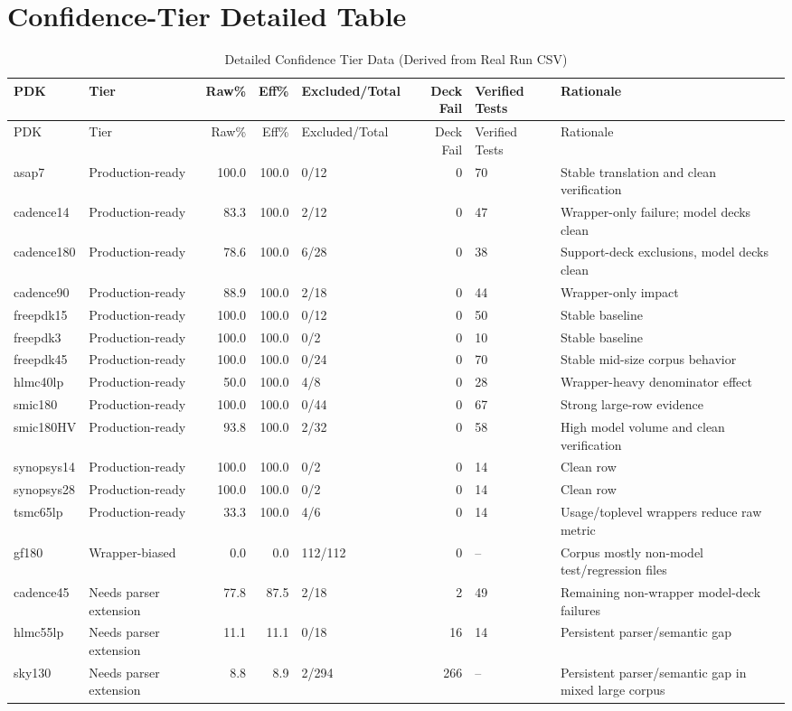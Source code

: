 \documentclass[12pt,a4paper,oneside]{report}
\begin{document}
\chapter{Confidence-Tier Detailed Table}

\begin{landscape}
\small
\begin{longtable}{p{2.2cm}p{2.6cm}r r p{2.0cm}r p{2.4cm}p{4.8cm}}
\caption{Detailed Confidence Tier Data (Derived from Real Run CSV)}
\label{tab:tier-detailed}\\
\toprule
PDK & Tier & Raw\% & Eff\% & Excluded/Total & Deck Fail & Verified Tests & Rationale \\
\midrule
\endfirsthead
\toprule
PDK & Tier & Raw\% & Eff\% & Excluded/Total & Deck Fail & Verified Tests & Rationale \\
\midrule
\endhead
asap7 & Production-ready & 100.0 & 100.0 & 0/12 & 0 & 70 & Stable translation and clean verification \\
cadence14 & Production-ready & 83.3 & 100.0 & 2/12 & 0 & 47 & Wrapper-only failure; model decks clean \\
cadence180 & Production-ready & 78.6 & 100.0 & 6/28 & 0 & 38 & Support-deck exclusions, model decks clean \\
cadence90 & Production-ready & 88.9 & 100.0 & 2/18 & 0 & 44 & Wrapper-only impact \\
freepdk15 & Production-ready & 100.0 & 100.0 & 0/12 & 0 & 50 & Stable baseline \\
freepdk3 & Production-ready & 100.0 & 100.0 & 0/2 & 0 & 10 & Stable baseline \\
freepdk45 & Production-ready & 100.0 & 100.0 & 0/24 & 0 & 70 & Stable mid-size corpus behavior \\
hlmc40lp & Production-ready & 50.0 & 100.0 & 4/8 & 0 & 28 & Wrapper-heavy denominator effect \\
smic180 & Production-ready & 100.0 & 100.0 & 0/44 & 0 & 67 & Strong large-row evidence \\
smic180HV & Production-ready & 93.8 & 100.0 & 2/32 & 0 & 58 & High model volume and clean verification \\
synopsys14 & Production-ready & 100.0 & 100.0 & 0/2 & 0 & 14 & Clean row \\
synopsys28 & Production-ready & 100.0 & 100.0 & 0/2 & 0 & 14 & Clean row \\
tsmc65lp & Production-ready & 33.3 & 100.0 & 4/6 & 0 & 14 & Usage/toplevel wrappers reduce raw metric \\
gf180 & Wrapper-biased & 0.0 & 0.0 & 112/112 & 0 & -- & Corpus mostly non-model test/regression files \\
cadence45 & Needs parser extension & 77.8 & 87.5 & 2/18 & 2 & 49 & Remaining non-wrapper model-deck failures \\
hlmc55lp & Needs parser extension & 11.1 & 11.1 & 0/18 & 16 & 14 & Persistent parser/semantic gap \\
sky130 & Needs parser extension & 8.8 & 8.9 & 2/294 & 266 & -- & Persistent parser/semantic gap in mixed large corpus \\
\bottomrule
\end{longtable}
\end{landscape}
\end{document}
